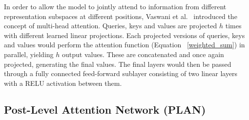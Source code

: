 \documentclass[letterpaper]{article} %
\begin{document}
In order to allow the model to jointly attend to information from different representation subspaces at different positions, Vaswani et al.~ introduced the concept of multi-head attention. Queries, keys and values are projected $h$ times with different learned linear projections. Each projected versions of queries, keys and values would perform the attention function (Equation ~\ref{weighted_sum}) in parallel, yielding $h$ output values. These are concatenated and once again projected, generating the final values. The final layers would then be passed through a fully connected feed-forward sublayer consisting of two linear layers with a RELU activation between them.

\subsection{Post-Level Attention Network (PLAN)}
\label{sec:plan}
\end{document}

